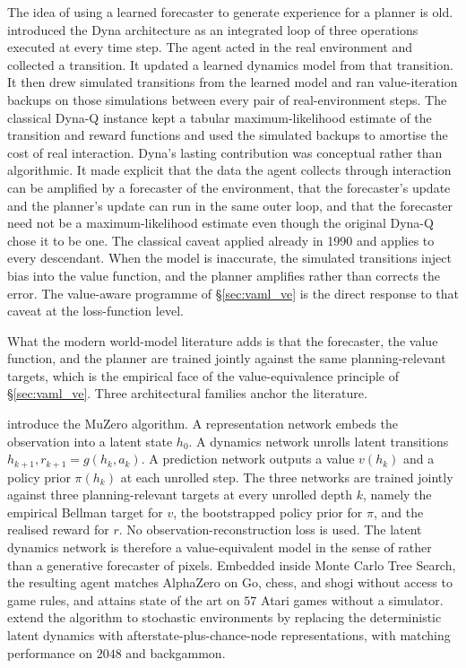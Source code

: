The idea of using a learned forecaster to generate experience for a
planner is old. \citet{sutton1990} introduced the Dyna architecture as
an integrated loop of three operations executed at every time step.
The agent acted in the real environment and collected a transition. It
updated a learned dynamics model from that transition. It then drew
simulated transitions from the learned model and ran value-iteration
backups on those simulations between every pair of real-environment
steps. The classical Dyna-Q instance kept a tabular maximum-likelihood
estimate of the transition and reward functions and used the simulated
backups to amortise the cost of real interaction. Dyna's lasting
contribution was conceptual rather than algorithmic. It made explicit
that the data the agent collects through interaction can be amplified
by a forecaster of the environment, that the forecaster's update and
the planner's update can run in the same outer loop, and that the
forecaster need not be a maximum-likelihood estimate even though the
original Dyna-Q chose it to be one. The classical caveat applied
already in 1990 and applies to every descendant. When the model is
inaccurate, the simulated transitions inject bias into the value
function, and the planner amplifies rather than corrects the error.
The value-aware programme of \S\ref{sec:vaml_ve} is the direct response
to that caveat at the loss-function level.

What the modern world-model literature adds is that the forecaster, the
value function, and the planner are trained jointly against the same
planning-relevant targets, which is the empirical face of the
value-equivalence principle of \S\ref{sec:vaml_ve}. Three architectural
families anchor the literature.

\citet{Schrittwieser2020MuZero} introduce the MuZero algorithm. A
representation network embeds the observation into a latent state $h_0$.
A dynamics network unrolls latent transitions
$h_{k+1}, r_{k+1} = g(h_k, a_k)$. A prediction network outputs a value
$v(h_k)$ and a policy prior $\pi(h_k)$ at each unrolled step. The three
networks are trained jointly against three planning-relevant targets at
every unrolled depth $k$, namely the empirical Bellman target for $v$,
the bootstrapped policy prior for $\pi$, and the realised reward for $r$.
No observation-reconstruction loss is used. The latent dynamics network
is therefore a value-equivalent model in the sense of
\citet{GrimmVALEQ2020} rather than a generative forecaster of pixels.
Embedded inside Monte Carlo Tree Search, the resulting agent matches
AlphaZero on Go, chess, and shogi without access to game rules, and
attains state of the art on $57$ Atari games without a simulator.
\citet{Antonoglou2022StochMuZero} extend the algorithm to stochastic
environments by replacing the deterministic latent dynamics with
afterstate-plus-chance-node representations, with matching performance on
$2048$ and backgammon.

